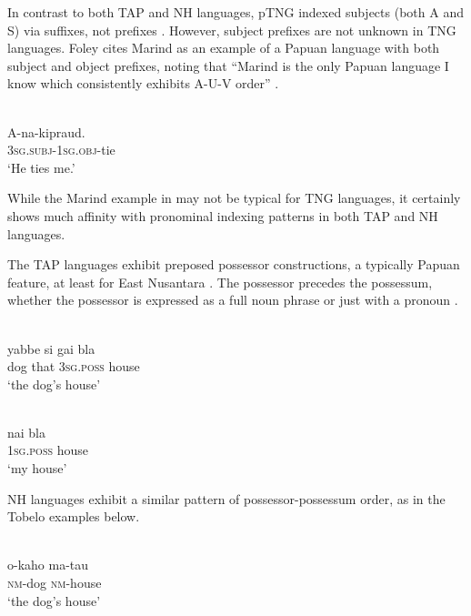 In contrast to both TAP and NH languages, pTNG indexed subjects (both A and S) via suffixes, not prefixes \citep{Foley2000}. However, subject prefixes are not unknown in TNG languages. Foley cites Marind as an example of a Papuan language with both subject and object prefixes, noting that ``Marind is the only Papuan language I know which consistently exhibits A-U-V order'' \citeyearpar[138]{Foley1986}.

\ea%
\label{ex:4:12}
 \\
\gll  A-na-kipraud. \\
   3\textsc{sg.subj-1sg.obj-}tie \\
\glt `He ties me.'
\z





While the Marind example in  may not be typical for TNG languages, it certainly shows much affinity with pronominal indexing patterns in both TAP and NH languages.

The TAP languages exhibit preposed possessor constructions, a typically Papuan feature, at least for East Nusantara \citep{KlamerEtAl2008}. The possessor precedes the possessum, whether the possessor is expressed as a full noun phrase  or just with a pronoun .


\ea%
\label{ex:4:13}
 \\
\gll  yabbe si gai bla \\
   dog that \textsc{3sg.poss} house \\
\glt `the dog's house'
\z





\ea%
\label{ex:4:14}
 \\
\gll  nai bla \\
  \textsc{1sg.poss} house \\
\glt `my house'
\z





NH languages exhibit a similar pattern of possessor-possessum order, as in the Tobelo examples below.

\ea%
\label{ex:4:15}
 \\
\gll  o-kaho ma-tau \\
   \textsc{nm}-dog \textsc{nm}-house\\
\glt `the dog's house'
\z





